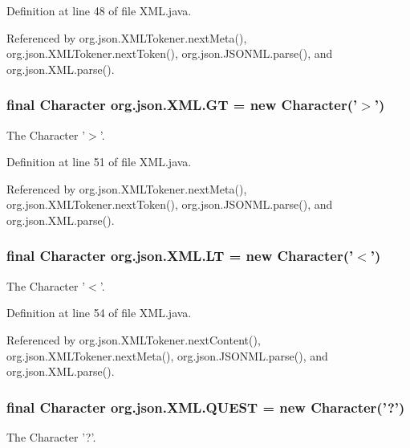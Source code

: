 Definition at line 48 of file X\-M\-L.\-java.



Referenced by org.\-json.\-X\-M\-L\-Tokener.\-next\-Meta(), org.\-json.\-X\-M\-L\-Tokener.\-next\-Token(), org.\-json.\-J\-S\-O\-N\-M\-L.\-parse(), and org.\-json.\-X\-M\-L.\-parse().

\hypertarget{classorg_1_1json_1_1_x_m_l_a0a9f1aaef15f78d43c532e601546a722}{
\subsubsection[{G\-T}]{\setlength{\rightskip}{0pt plus 5cm}final Character org.\-json.\-X\-M\-L.\-G\-T = new Character('$>$')\hspace{0.3cm}{\ttfamily [static]}}}\label{classorg_1_1json_1_1_x_m_l_a0a9f1aaef15f78d43c532e601546a722}
The Character '$>$'. 

Definition at line 51 of file X\-M\-L.\-java.



Referenced by org.\-json.\-X\-M\-L\-Tokener.\-next\-Meta(), org.\-json.\-X\-M\-L\-Tokener.\-next\-Token(), org.\-json.\-J\-S\-O\-N\-M\-L.\-parse(), and org.\-json.\-X\-M\-L.\-parse().

\hypertarget{classorg_1_1json_1_1_x_m_l_a12c351d05c7c78c4730d1ec44ae6b798}{
\subsubsection[{L\-T}]{\setlength{\rightskip}{0pt plus 5cm}final Character org.\-json.\-X\-M\-L.\-L\-T = new Character('$<$')\hspace{0.3cm}{\ttfamily [static]}}}\label{classorg_1_1json_1_1_x_m_l_a12c351d05c7c78c4730d1ec44ae6b798}
The Character '$<$'. 

Definition at line 54 of file X\-M\-L.\-java.



Referenced by org.\-json.\-X\-M\-L\-Tokener.\-next\-Content(), org.\-json.\-X\-M\-L\-Tokener.\-next\-Meta(), org.\-json.\-J\-S\-O\-N\-M\-L.\-parse(), and org.\-json.\-X\-M\-L.\-parse().

\hypertarget{classorg_1_1json_1_1_x_m_l_a6ee91c7c64c44b62b197a69b00ee383f}{
\subsubsection[{Q\-U\-E\-S\-T}]{\setlength{\rightskip}{0pt plus 5cm}final Character org.\-json.\-X\-M\-L.\-Q\-U\-E\-S\-T = new Character('?')\hspace{0.3cm}{\ttfamily [static]}}}\label{classorg_1_1json_1_1_x_m_l_a6ee91c7c64c44b62b197a69b00ee383f}
The Character '?'. 

